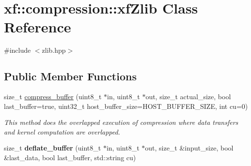 \hypertarget{classxf_1_1compression_1_1xfZlib}{\section{xf\-:\-:compression\-:\-:xf\-Zlib Class Reference}
\label{classxf_1_1compression_1_1xfZlib}
}


{\ttfamily \#include $<$zlib.\-hpp$>$}

\subsection*{Public Member Functions}
\begin{DoxyCompactItemize}
\item 
size\-\_\-t \hyperlink{classxf_1_1compression_1_1xfZlib_ab52ee4c6869563448f489cd3c81dd2da}{compress\-\_\-buffer} (uint8\-\_\-t $\ast$in, uint8\-\_\-t $\ast$out, size\-\_\-t actual\-\_\-size, bool last\-\_\-buffer=true, uint32\-\_\-t host\-\_\-buffer\-\_\-size=H\-O\-S\-T\-\_\-\-B\-U\-F\-F\-E\-R\-\_\-\-S\-I\-Z\-E, int cu=0)
\begin{DoxyCompactList}\small\item\em This method does the overlapped execution of compression where data transfers and kernel computation are overlapped. \end{DoxyCompactList}\item 
\hypertarget{classxf_1_1compression_1_1xfZlib_a055669f3d7d7dfe98761b48b0b3ae307}{size\-\_\-t {\bfseries deflate\-\_\-buffer} (uint8\-\_\-t $\ast$in, uint8\-\_\-t $\ast$out, size\-\_\-t \&input\-\_\-size, bool \&last\-\_\-data, bool last\-\_\-buffer, std\-::string cu)}\label{classxf_1_1compression_1_1xfZlib_a055669f3d7d7dfe98761b48b0b3ae307}


\end{DoxyCompactItemize}
